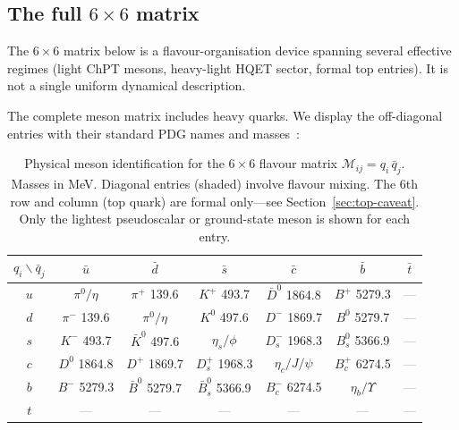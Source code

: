 \documentclass[11pt,a4paper]{article}
\begin{document}
\subsection{The full $6 \times 6$ matrix}
\label{sec:full-6x6}

The $6 \times 6$ matrix below is a flavour-organisation device spanning
several effective regimes (light ChPT mesons, heavy-light HQET sector,
formal top entries).  It is not a single uniform dynamical description.

The complete meson matrix includes heavy quarks.  We display the
off-diagonal entries with their standard PDG names and
masses~\cite{PDG2024}:

\begin{table}[h!]
\centering
\renewcommand{\arraystretch}{1.3}
\caption{Physical meson identification for the $6 \times 6$ flavour
  matrix $\mathcal{M}_{ij} = q_i\,\bar{q}_j$.  Masses in MeV.
  Diagonal entries (shaded) involve flavour mixing.  The 6th row and
  column (top quark) are formal only---see
  Section~\ref{sec:top-caveat}.  Only the lightest pseudoscalar or
  ground-state meson is shown for each entry.}
\label{tab:6x6-meson}
\medskip
\small
\begin{tabular}{c|cccccc}
\toprule
$q_i \backslash \bar{q}_j$ & $\bar{u}$ & $\bar{d}$ & $\bar{s}$
  & $\bar{c}$ & $\bar{b}$ & $\bar{t}$ \\
\midrule
$u$ & $\pi^0/\eta$ & $\pi^+$ \scriptsize{139.6} & $K^+$ \scriptsize{493.7}
  & $\bar{D}^0$ \scriptsize{1864.8} & $B^+$ \scriptsize{5279.3}
  & \textcolor{gray}{---} \\
$d$ & $\pi^-$ \scriptsize{139.6} & $\pi^0/\eta$ & $K^0$ \scriptsize{497.6}
  & $D^-$ \scriptsize{1869.7} & $B^0$ \scriptsize{5279.7}
  & \textcolor{gray}{---} \\
$s$ & $K^-$ \scriptsize{493.7} & $\bar{K}^0$ \scriptsize{497.6}
  & $\eta_s/\phi$ & $D_s^-$ \scriptsize{1968.3}
  & $B_s^0$ \scriptsize{5366.9} & \textcolor{gray}{---} \\
$c$ & $D^0$ \scriptsize{1864.8} & $D^+$ \scriptsize{1869.7}
  & $D_s^+$ \scriptsize{1968.3} & $\eta_c/J/\psi$
  & $B_c^+$ \scriptsize{6274.5} & \textcolor{gray}{---} \\
$b$ & $B^-$ \scriptsize{5279.3} & $\bar{B}^0$ \scriptsize{5279.7}
  & $\bar{B}_s^0$ \scriptsize{5366.9}
  & $B_c^-$ \scriptsize{6274.5} & $\eta_b/\Upsilon$
  & \textcolor{gray}{---} \\
$t$ & \textcolor{gray}{---} & \textcolor{gray}{---}
  & \textcolor{gray}{---} & \textcolor{gray}{---}
  & \textcolor{gray}{---} & \textcolor{gray}{---} \\
\bottomrule
\end{tabular}
\end{table}
\end{document}

